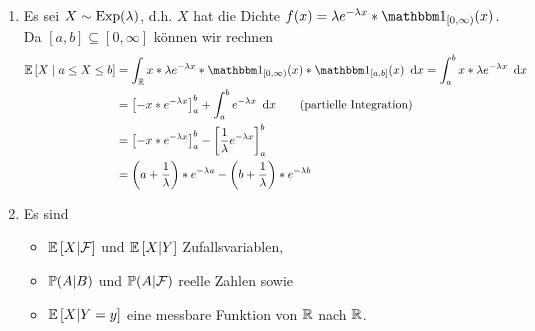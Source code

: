 \begin{exercisePage}
	\begin{enumerate}[label=(\alph*)]
		\item Es sei $X \sim \Exp(\lambda)$, d.h. $X$ hat die Dichte $f(x) = \lambda e^{-\lambda x} * \one_{[0,\infty)}(x)$.
		Da $[a,b] \subseteq [0,\infty]$ können wir rechnen
		\begin{align*}
			\EW[X \mid a \le X \le b] &= \int_\R x * \lambda e^{-\lambda x} *\one_{[0,\infty)}(x) * \one_{[a,b]}(x) \dx 
			= \int_a^b x * \lambda e^{-\lambda x} \dx \\
			&= \sqbrackets{-x * e^{-\lambda x}}_a^b + \int_a^b e^{-\lambda x} \dx \tag{partielle Integration} \\
			&= \sqbrackets{-x * e^{-\lambda x}}_a^b - \sqbrackets{\frac{1}{\lambda} e^{-\lambda x}}_a^b \\
			&= \brackets{a + \frac{1}{\lambda}} * e^{-\lambda a} - \brackets{b + \frac{1}{\lambda}} * e^{-\lambda b}
		\end{align*}
		\item Es sind
		\begin{itemize}
			\item $\EW[X | \F]$ und $\EW[X | Y]$ Zufallsvariablen,
			\item $\P(A | B)$ und $\P(A | \F)$ reelle Zahlen sowie
			\item $\EW[X | Y=y]$ eine messbare Funktion von $\R$ nach $\R$.
		\end{itemize}
	\end{enumerate}


	\newcommand{\xy}{\left(\begin{smallmatrix} x \\ y \end{smallmatrix}\right)}
	

\end{exercisePage}
